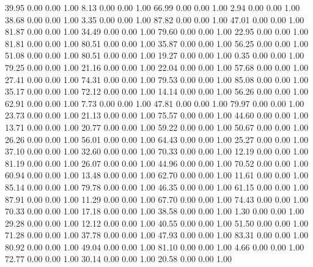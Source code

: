    39.95   0.00   0.00   1.00
    8.13   0.00   0.00   1.00
   66.99   0.00   0.00   1.00
    2.94   0.00   0.00   1.00
   38.68   0.00   0.00   1.00
    3.35   0.00   0.00   1.00
   87.82   0.00   0.00   1.00
   47.01   0.00   0.00   1.00
   81.87   0.00   0.00   1.00
   34.49   0.00   0.00   1.00
   79.60   0.00   0.00   1.00
   22.95   0.00   0.00   1.00
   81.81   0.00   0.00   1.00
   80.51   0.00   0.00   1.00
   35.87   0.00   0.00   1.00
   56.25   0.00   0.00   1.00
   51.08   0.00   0.00   1.00
   80.51   0.00   0.00   1.00
   19.27   0.00   0.00   1.00
    0.35   0.00   0.00   1.00
   79.25   0.00   0.00   1.00
   21.16   0.00   0.00   1.00
   22.04   0.00   0.00   1.00
   57.68   0.00   0.00   1.00
   27.41   0.00   0.00   1.00
   74.31   0.00   0.00   1.00
   79.53   0.00   0.00   1.00
   85.08   0.00   0.00   1.00
   35.17   0.00   0.00   1.00
   72.12   0.00   0.00   1.00
   14.14   0.00   0.00   1.00
   56.26   0.00   0.00   1.00
   62.91   0.00   0.00   1.00
    7.73   0.00   0.00   1.00
   47.81   0.00   0.00   1.00
   79.97   0.00   0.00   1.00
   23.73   0.00   0.00   1.00
   21.13   0.00   0.00   1.00
   75.57   0.00   0.00   1.00
   44.60   0.00   0.00   1.00
   13.71   0.00   0.00   1.00
   20.77   0.00   0.00   1.00
   59.22   0.00   0.00   1.00
   50.67   0.00   0.00   1.00
   26.26   0.00   0.00   1.00
   56.01   0.00   0.00   1.00
   64.43   0.00   0.00   1.00
   25.27   0.00   0.00   1.00
   37.10   0.00   0.00   1.00
   32.60   0.00   0.00   1.00
   70.33   0.00   0.00   1.00
   12.19   0.00   0.00   1.00
   81.19   0.00   0.00   1.00
   26.07   0.00   0.00   1.00
   44.96   0.00   0.00   1.00
   70.52   0.00   0.00   1.00
   60.94   0.00   0.00   1.00
   13.48   0.00   0.00   1.00
   62.70   0.00   0.00   1.00
   11.61   0.00   0.00   1.00
   85.14   0.00   0.00   1.00
   79.78   0.00   0.00   1.00
   46.35   0.00   0.00   1.00
   61.15   0.00   0.00   1.00
   87.91   0.00   0.00   1.00
   11.29   0.00   0.00   1.00
   67.70   0.00   0.00   1.00
   74.43   0.00   0.00   1.00
   70.33   0.00   0.00   1.00
   17.18   0.00   0.00   1.00
   38.58   0.00   0.00   1.00
    1.30   0.00   0.00   1.00
   29.28   0.00   0.00   1.00
   12.12   0.00   0.00   1.00
   40.55   0.00   0.00   1.00
   51.50   0.00   0.00   1.00
   71.28   0.00   0.00   1.00
   37.78   0.00   0.00   1.00
   47.93   0.00   0.00   1.00
   83.31   0.00   0.00   1.00
   80.92   0.00   0.00   1.00
   49.04   0.00   0.00   1.00
   81.10   0.00   0.00   1.00
    4.66   0.00   0.00   1.00
   72.77   0.00   0.00   1.00
   30.14   0.00   0.00   1.00
   20.58   0.00   0.00   1.00
